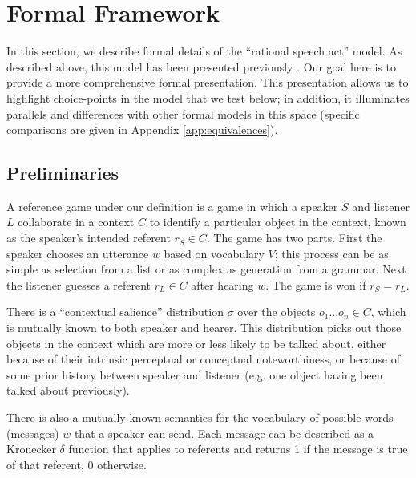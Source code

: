 \section{Formal Framework}
\label{sec:models}

In this section, we describe formal details of the ``rational speech act'' model. As described above, this model has been presented previously \cite{frank2012,goodman2013}. Our goal here is to provide a more comprehensive formal presentation. This presentation allows us to highlight choice-points in the model that we test below; in addition, it illuminates parallels and differences with other formal models in this space (specific comparisons are given in Appendix \ref{app:equivalences}).



\subsection{Preliminaries}

A reference game under our definition is a game in which a speaker $S$ and listener $L$ collaborate in a context $C$ to identify a particular object in the context, known as the speaker's intended referent $r_S \in C$. The game has two parts. First the speaker chooses an utterance $w$ based on vocabulary $V$; this process can be as simple as selection from a list or as complex as generation from a grammar. Next the listener guesses a referent $r_L \in C$ after hearing $w$. The game is won if $r_S=r_L$.

There is a ``contextual salience'' distribution $\sigma$ over the objects ${o_1 ... o_n} \in C$, which is mutually known to both speaker and hearer. This distribution picks out those objects in the context which are more or less likely to be talked about, either because of their intrinsic perceptual or conceptual noteworthiness, or because of some prior history between speaker and listener (e.g. one object having been talked about previously). 

There is also a mutually-known semantics for the vocabulary of possible words (messages) $w$ that a speaker can send.  Each message can be described as a Kronecker $\delta$ function that applies to referents and returns 1 if the message is true of that referent, 0 otherwise. 

